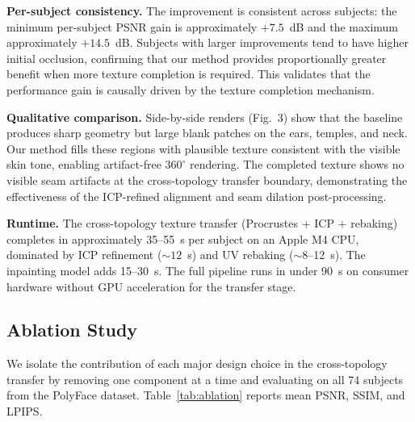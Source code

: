 \documentclass[conference]{IEEEtran}
\begin{document}
\medskip\noindent\textbf{Per-subject consistency.}
The improvement is consistent across subjects: the minimum per-subject PSNR
gain is approximately $+7.5$~dB and the maximum approximately $+14.5$~dB.
Subjects with larger improvements tend to have higher initial occlusion,
confirming that our method provides proportionally greater benefit when more
texture completion is required. This validates that the performance gain is
causally driven by the texture completion mechanism.

\medskip\noindent\textbf{Qualitative comparison.}
Side-by-side renders (Fig.~3) show that the baseline produces sharp geometry
but large blank patches on the ears, temples, and neck. Our method fills these
regions with plausible texture consistent with the visible skin tone, enabling
artifact-free $360^{\circ}$ rendering. The completed texture shows no visible
seam artifacts at the cross-topology transfer boundary, demonstrating the
effectiveness of the ICP-refined alignment and seam dilation post-processing.

\medskip\noindent\textbf{Runtime.}
The cross-topology texture transfer (Procrustes + ICP + rebaking) completes in
approximately 35--55~s per subject on an Apple M4 CPU, dominated by ICP
refinement (${\sim}12$~s) and UV rebaking (${\sim}8$--12~s). The inpainting
model adds 15--30~s. The full pipeline runs in under 90~s on consumer hardware
without GPU acceleration for the transfer stage.

\subsection{Ablation Study}
\label{sec:ablation}

We isolate the contribution of each major design choice in the cross-topology
transfer by removing one component at a time and evaluating on all 74 subjects
from the PolyFace dataset. Table~\ref{tab:ablation} reports mean PSNR, SSIM,
and LPIPS.

\begin{table}[h]
  \caption{Ablation of cross-topology transfer components (74 subjects).}
  \label{tab:ablation}
  \centering
\end{table}
\end{document}
